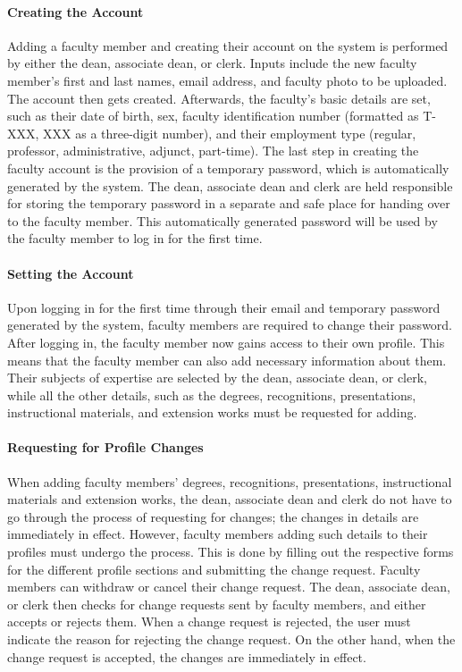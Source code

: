         \paragraph{Creating the Account}
        Adding a faculty member and creating their account on the system is performed by either the dean, associate dean, or clerk. Inputs include the new faculty member's first and last names, email address, and faculty photo to be uploaded. The account then gets created. Afterwards, the faculty's basic details are set, such as their date of birth, sex, faculty identification number (formatted as T-XXX, XXX as a three-digit number), and their employment type (regular, professor, administrative, adjunct, part-time). The last step in creating the faculty account is the provision of a temporary password, which is automatically generated by the system. The dean, associate dean and clerk are held responsible for storing the temporary password in a separate and safe place for handing over to the faculty member. This automatically generated password will be used by the faculty member to log in for the first time.
    
        \paragraph{Setting the Account}
        Upon logging in for the first time through their email and temporary password generated by the system, faculty members are required to change their password. After logging in, the faculty member now gains access to their own profile. This means that the faculty member can also add necessary information about them. Their subjects of expertise are selected by the dean, associate dean, or clerk, while all the other details, such as the degrees, recognitions, presentations, instructional materials, and extension works must be requested for adding.
    
        \paragraph{Requesting for Profile Changes}
        When adding faculty members' degrees, recognitions, presentations, instructional materials and extension works, the dean, associate dean and clerk do not have to go through the process of requesting for changes; the changes in details are immediately in effect. However, faculty members adding such details to their profiles must undergo the process. This is done by filling out the respective forms for the different profile sections and submitting the change request. Faculty members can withdraw or cancel their change request. The dean, associate dean, or clerk then checks for change requests sent by faculty members, and either accepts or rejects them. When a change request is rejected, the user must indicate the reason for rejecting the change request. On the other hand, when the change request is accepted, the changes are immediately in effect.

